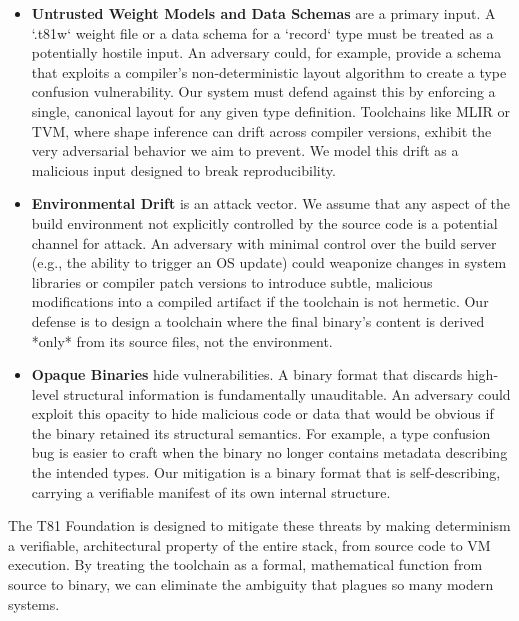 \documentclass[sigconf, 10pt]{acmart}
\begin{document}
\begin{itemize}
\item \textbf{Untrusted Weight Models and Data Schemas} are a primary input. A `.t81w` weight file or a data schema for a `record` type must be treated as a potentially hostile input. An adversary could, for example, provide a schema that exploits a compiler's non-deterministic layout algorithm to create a type confusion vulnerability. Our system must defend against this by enforcing a single, canonical layout for any given type definition. Toolchains like MLIR or TVM, where shape inference can drift across compiler versions, exhibit the very adversarial behavior we aim to prevent. We model this drift as a malicious input designed to break reproducibility.
\item \textbf{Environmental Drift} is an attack vector. We assume that any aspect of the build environment not explicitly controlled by the source code is a potential channel for attack. An adversary with minimal control over the build server (e.g., the ability to trigger an OS update) could weaponize changes in system libraries or compiler patch versions to introduce subtle, malicious modifications into a compiled artifact if the toolchain is not hermetic. Our defense is to design a toolchain where the final binary's content is derived *only* from its source files, not the environment.
\item \textbf{Opaque Binaries} hide vulnerabilities. A binary format that discards high-level structural information is fundamentally unauditable. An adversary could exploit this opacity to hide malicious code or data that would be obvious if the binary retained its structural semantics. For example, a type confusion bug is easier to craft when the binary no longer contains metadata describing the intended types. Our mitigation is a binary format that is self-describing, carrying a verifiable manifest of its own internal structure.
\end{itemize}
The T81 Foundation is designed to mitigate these threats by making determinism a verifiable, architectural property of the entire stack, from source code to VM execution. By treating the toolchain as a formal, mathematical function from source to binary, we can eliminate the ambiguity that plagues so many modern systems.
\end{document}
